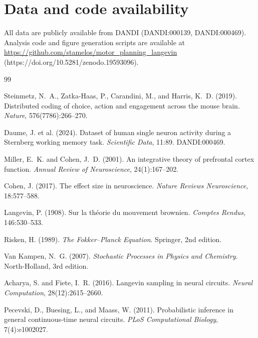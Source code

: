 \documentclass[10pt,onecolumn]{article}
\begin{document}
\newpage
\section{Data and code availability}
All data are publicly available from DANDI (DANDI:000139, DANDI:000469). Analysis code and figure generation scripts are available at \url{https://github.com/stamelos/motor_planning_langevin} (https://doi.org/10.5281/zenodo.19593096).

\newpage
\begin{thebibliography}{99}

Steinmetz, N.~A., Zatka-Haas, P., Carandini, M., and Harris, K.~D. (2019).
\newblock Distributed coding of choice, action and engagement across the mouse brain.
\newblock \textit{Nature}, 576(7786):266--270.

Daume, J. et al. (2024).
\newblock Dataset of human single neuron activity during a Sternberg working memory task.
\newblock \textit{Scientific Data}, 11:89. DANDI:000469.

Miller, E.~K. and Cohen, J.~D. (2001).
\newblock An integrative theory of prefrontal cortex function.
\newblock \textit{Annual Review of Neuroscience}, 24(1):167--202.

Cohen, J. (2017).
\newblock The effect size in neuroscience.
\newblock \textit{Nature Reviews Neuroscience}, 18:577--588.


Langevin, P. (1908).
\newblock Sur la théorie du mouvement brownien.
\newblock \textit{Comptes Rendus}, 146:530--533.

Risken, H. (1989).
\newblock \textit{The Fokker–Planck Equation}.
\newblock Springer, 2nd edition.

Van Kampen, N.~G. (2007).
\newblock \textit{Stochastic Processes in Physics and Chemistry}.
\newblock North-Holland, 3rd edition.

Acharya, S. and Fiete, I.~R. (2016).
\newblock Langevin sampling in neural circuits.
\newblock \textit{Neural Computation}, 28(12):2615--2660.

Pecevski, D., Buesing, L., and Maass, W. (2011).
\newblock Probabilistic inference in general continuous-time neural circuits.
\newblock \textit{PLoS Computational Biology}, 7(4):e1002027.


\end{thebibliography}
\end{document}
